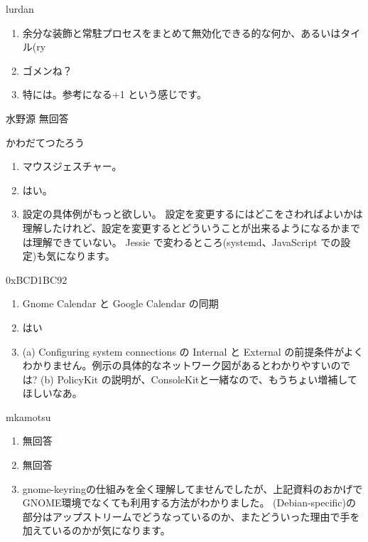 \documentclass[mingoth,a4paper]{jsarticle}
\begin{document}
\begin{prework}{lurdan}
  \begin{enumerate}
  \item 余分な装飾と常駐プロセスをまとめて無効化できる的な何か、あるいはタイル(ry
  \item ゴメンね？
  \item 特には。参考になる+1 という感じです。
  \end{enumerate}
\end{prework}


\begin{prework}{水野源}
  無回答
\end{prework}

\begin{prework}{かわだてつたろう}
  \begin{enumerate}
  \item マウスジェスチャー。
  \item はい。
  \item 設定の具体例がもっと欲しい。
  設定を変更するにはどこをさわればよいかは理解したけれど、設定を変更するとどういうことが出来るようになるかまでは理解できていない。
Jessie で変わるところ(systemd、JavaScript での設定)も気になります。
  \end{enumerate}
\end{prework}

\begin{prework}{0xBCD1BC92}
  \begin{enumerate}
  \item Gnome Calendar と Google Calendar の同期
  \item はい
  \item (a) Configuring system connections の Internal と External の前提条件がよくわかりません。例示の具体的なネットワーク図があるとわかりやすいのでは?
        (b) PolicyKit の説明が、ConsoleKitと一緒なので、もうちょい増補してほしいなあ。 
  \end{enumerate}
\end{prework}

\begin{prework}{mkamotsu}
  \begin{enumerate}
  \item 無回答
  \item 無回答
  \item gnome-keyringの仕組みを全く理解してませんでしたが、上記資料のおかげでGNOME環境でなくても利用する方法がわかりました。
(Debian-specific)の部分はアップストリームでどうなっているのか、またどういった理由で手を加えているのかが気になります。
  \end{enumerate}
\end{prework}
\end{document}

